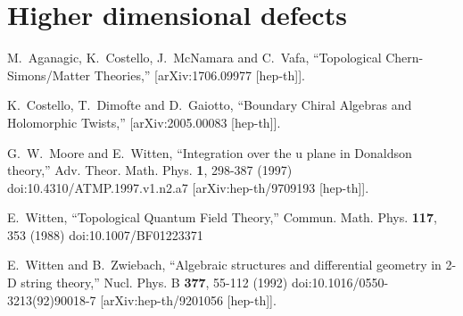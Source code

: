 \documentclass[11pt]{amsart}
\def\brian#1{{\textcolor{blue!65!red}{BRW: {#1}}}}
\begin{document}
\section{Higher dimensional defects} 


\begin{thebibliography}{KWWY14}

M.~Aganagic, K.~Costello, J.~McNamara and C.~Vafa,
``Topological Chern-Simons/Matter Theories,''
[arXiv:1706.09977 [hep-th]].

K.~Costello, T.~Dimofte and D.~Gaiotto,
``Boundary Chiral Algebras and Holomorphic Twists,''
[arXiv:2005.00083 [hep-th]].

G.~W.~Moore and E.~Witten,
``Integration over the u plane in Donaldson theory,''
Adv. Theor. Math. Phys. \textbf{1}, 298-387 (1997)
doi:10.4310/ATMP.1997.v1.n2.a7
[arXiv:hep-th/9709193 [hep-th]].

E.~Witten,
``Topological Quantum Field Theory,''
Commun. Math. Phys. \textbf{117}, 353 (1988)
doi:10.1007/BF01223371

E.~Witten and B.~Zwiebach,
``Algebraic structures and differential geometry in 2-D string theory,''
Nucl. Phys. B \textbf{377}, 55-112 (1992)
doi:10.1016/0550-3213(92)90018-7
[arXiv:hep-th/9201056 [hep-th]].


\end{thebibliography}
\end{document}
